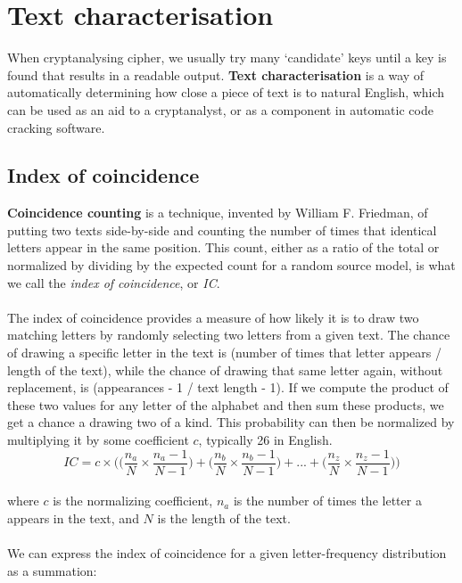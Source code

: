 \documentclass[Lau,binding=0.6cm,oneside]{sapthesis}
\begin{document}
\section{Text characterisation}
When cryptanalysing cipher, we usually try many `candidate' keys until a key is found that results in a readable output. \textbf{Text characterisation} is a way of automatically determining how close a piece of text is to natural English, which can be used as an aid to a cryptanalyst, or as a component in automatic code cracking software.
\subsection{Index of coincidence}
\textbf{Coincidence counting} is a technique, invented by William F. Friedman, of putting two texts side-by-side and counting the number of times that identical letters appear in the same position. This count, either as a ratio of the total or normalized by dividing by the expected count for a random source model, is what we call the \textit{index of coincidence}, or \textit{IC}\supercite{index_of_coincidence}.\\\\
The index of coincidence provides a measure of how likely it is to draw two matching letters by randomly selecting two letters from a given text. The chance of drawing a specific letter in the text is (number of times that letter appears / length of the text), while the chance of drawing that same letter again, without replacement, is (appearances - 1 / text length - 1). If we compute the product of these two values for any letter of the alphabet and then sum these products, we get a chance a drawing two of a kind. This probability can then be normalized by multiplying it by some coefficient $c$, typically 26 in English.\\

\begin{equation}
IC = c \times \bigg(\Big(\frac{n_{a}}{N} \times \frac{n_{a}-1}{N-1}\Big) + \Big(\frac{n_{b}}{N} \times \frac{n_{b}-1}{N-1}\Big) + ... + \Big(\frac{n_{z}}{N} \times \frac{n_{z}-1}{N-1}\Big)\bigg)
\end{equation}
\ \\
where $c$ is the normalizing coefficient, $n_a$ is the number of times the letter \textsf{a} appears in the text, and $N$ is the length of the text.\\\\
We can express the index of coincidence for a given letter-frequency distribution as a summation:\\
\end{document}
